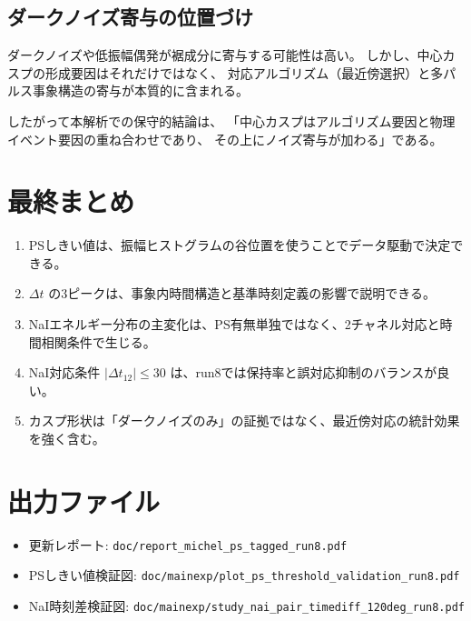 \documentclass[a4paper,11pt]{jsarticle}
\begin{document}
\subsection{ダークノイズ寄与の位置づけ}
ダークノイズや低振幅偶発が裾成分に寄与する可能性は高い。
しかし、中心カスプの形成要因はそれだけではなく、
対応アルゴリズム（最近傍選択）と多パルス事象構造の寄与が本質的に含まれる。

したがって本解析での保守的結論は、
「中心カスプはアルゴリズム要因と物理イベント要因の重ね合わせであり、
その上にノイズ寄与が加わる」である。

\section{最終まとめ}
\begin{enumerate}
  \item PSしきい値は、振幅ヒストグラムの谷位置を使うことでデータ駆動で決定できる。
  \item $\Delta t$ の3ピークは、事象内時間構造と基準時刻定義の影響で説明できる。
  \item NaIエネルギー分布の主変化は、PS有無単独ではなく、2チャネル対応と時間相関条件で生じる。
  \item NaI対応条件 $|\Delta t_{12}|\le30$ は、run8では保持率と誤対応抑制のバランスが良い。
  \item カスプ形状は「ダークノイズのみ」の証拠ではなく、最近傍対応の統計効果を強く含む。
\end{enumerate}

\section*{出力ファイル}
\begin{itemize}
  \item 更新レポート: \texttt{doc/report\_michel\_ps\_tagged\_run8.pdf}
  \item PSしきい値検証図: \texttt{doc/mainexp/plot\_ps\_threshold\_validation\_run8.pdf}
  \item NaI時刻差検証図: \texttt{doc/mainexp/study\_nai\_pair\_timediff\_120deg\_run8.pdf}
\end{itemize}
\end{document}
